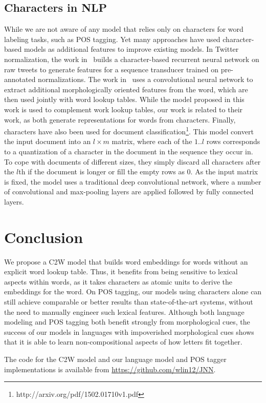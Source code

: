 \documentclass[11pt]{article}
\begin{document}
\begin{CJK*}{UTF8}{gbsn}
{\subsection{Characters in NLP}
While we are not aware of any model that relies only on characters for word labeling tasks, such as POS tagging. Yet many approaches have used character-based models as additional features to improve existing models. In Twitter normalization, the work in~\cite{chrupala2014normalizing} builds a character-based recurrent neural network on raw tweets to generate features for a sequence transducer trained on pre-annotated normalizations. The work in~\cite{icml2014c2_santos14} uses a convolutional neural network to extract additional morphologically oriented features from the word, which are then used jointly with word lookup tables. While the model proposed in this work is used to complement work lookup tables, our work is related to their work, as both generate representations for words from characters. Finally, characters have also been used for document classification\footnote{http://arxiv.org/pdf/1502.01710v1.pdf}. This model convert the input document into an $l\times m$ matrix, where each of the $1..l$ rows corresponds to a quantization of a character in the document in the sequence they occur in. To cope with documents of different sizes, they simply discard all characters after the $l$th if the document is longer or fill the empty rows as 0. As the input matrix is fixed, the model uses a traditional deep convolutional network, where a number of convolutional and max-pooling layers are applied followed by fully connected layers. 



}
\section{Conclusion}
\label{sec:conclusions}

We propose a C2W model that builds word embeddings for words without an explicit word lookup table. Thus, it benefits from being sensitive to lexical aspects within words, as it takes characters as atomic units to derive the embeddings for the word. On POS tagging, our models using characters alone can still achieve comparable or better results than state-of-the-art systems, without the need to manually engineer such lexical features. Although both language modeling and POS tagging both benefit strongly from morphological cues, the success of our models in languages with impoverished morphological cues shows that it is able to learn non-compositional aspects of how letters fit together. 

The code for the C2W model and our language model and POS tagger implementations is available from \url{https://github.com/wlin12/JNN}.

\end{CJK*} 
\end{document}
